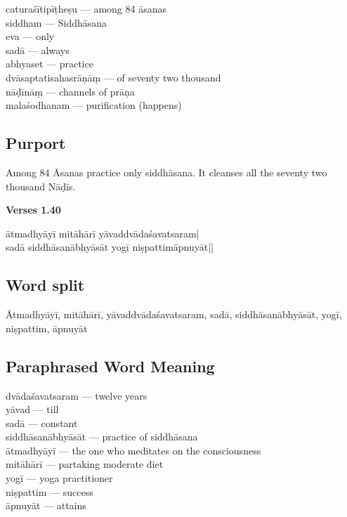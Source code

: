 \begin{multicols}{2}
\itemsep=0pt
caturaśītipīṭheṣu ---  among 84 āsanas \\
siddham --- Siddhāsana \\
eva ---  only \\
sadā --- always \\ 		
abhyaset ---  practice	 \\
dvāsaptatisahasrāṇāṃ ---  of seventy two thousand \\
nāḍīnāṃ --- channels of prāṇa \\
malaśodhanam ---  purification (happens)
\end{multicols}

\subsection*{Purport}

Among 84 Āsanas practice only siddhāsana. It cleanses all the seventy two thousand Nāḍīs. 

\newpage
\noindent \textbf{Verses 1.40}

\begin{shloka}
ātmadhyāyī mitāhārī yāvaddvādaśavatsaram|\\
sadā siddhāsanābhyāsāt yogī niṣpattimāpnuyāt||
\end{shloka}

\subsection*{Word split}

Ātmadhyāyī, mitāhārī, yāvaddvādaśavatsaram, sadā, siddhāsanābhyāsāt, yogī, niṣpattim, āpnuyāt

\subsection*{Paraphrased Word Meaning}

\begin{multicols}{2}
\itemsep=0pt
dvādaśavatsaram --- twelve years \\
yāvad --- till \\
sadā --- constant \\
siddhāsanābhyāsāt --- practice of siddhāsana \\
ātmadhyāyī --- the one who meditates on the consciousness \\
mitāhārī --- partaking moderate diet  \\
yogī --- yoga practitioner \\
niṣpattim ---  success  \\
āpnuyāt --- attains 
\end{multicols}

